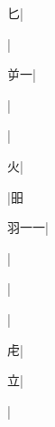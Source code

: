 \begin{multicols}{2}
{{\cjk{}{\cnsym{}　}{\cnsym{}　}匕}|{}\par
{\cjk{}{\cnsym{}　}{\cnsym{}　}{\cnsym{}　}}|{}\par
{\cjk{}{\cnsym{}　}屰一}|{}\par
{\cjk{}{\cnsym{}　}{\cnsym{}　}{\cnsym{}　}}|{}\par
{\cjk{}{\cnsym{}　}{\cnsym{}　}{\cnsym{}　}}|{}\par
{\cjk{}{\cnsym{}　}{\cnsym{}　}火}|{}\par
\null\par
{\cjk{}{\cnsym{}　}{\cnsym{}　}{\cnsym{}　}}\mktsJzrVerticalBar{}{\cjk{}{\cnsym{}　}{\cnsym{}　}{\cnsym{}　}}|{\cjk{}昍}\par
{\cjk{}羽一一}\mktsJzrVerticalBar{}{\cjk{}{\cnsym{}　}{\cnsym{}　}{\cnsym{}　}}|{}\par
{}\mktsJzrVerticalBar{}{\cjk{}{\cnsym{}　}{\cnsym{}　}{\cnsym{}　}}|{}\par
{}\mktsJzrVerticalBar{}{\cjk{}{\cnsym{}　}{\cnsym{}　}{\cnsym{}　}}|{}\par
{}\mktsJzrVerticalBar{}{\cjk{}{\cnsym{}　}{\cnsym{}　}{\cnsym{}　}}|{}\par
{虍}|{}\par
{\cjk{}{\cnsym{}　}{\cnsym{}　}立}|{}\par
{\cjk{}{\cnsym{}　}{\cnsym{}　}{\cnsym{}　}}|{}\par
}
\end{multicols}
